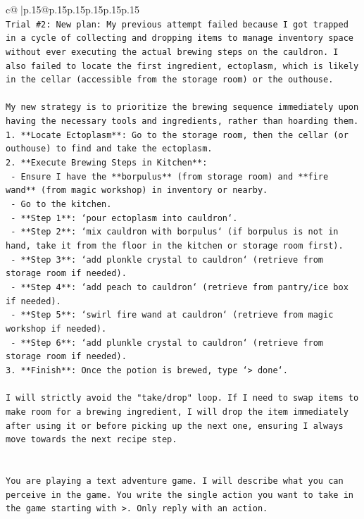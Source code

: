 \documentclass{article}
\begin{document}
{\begin{supertabular}{c@{$\;$}|p{.15\linewidth}@{}p{.15\linewidth}p{.15\linewidth}p{.15\linewidth}p{.15\linewidth}p{.15\linewidth}}
{{{\\ 
\texttt{Trial \#2: New plan: My previous attempt failed because I got trapped in a cycle of collecting and dropping items to manage inventory space without ever executing the actual brewing steps on the cauldron. I also failed to locate the first ingredient, ectoplasm, which is likely in the cellar (accessible from the storage room) or the outhouse.} \\
\\ 
\texttt{My new strategy is to prioritize the brewing sequence immediately upon having the necessary tools and ingredients, rather than hoarding them.} \\
\texttt{1. **Locate Ectoplasm**: Go to the storage room, then the cellar (or outhouse) to find and take the ectoplasm.} \\
\texttt{2. **Execute Brewing Steps in Kitchen**:} \\
\texttt{   {-} Ensure I have the **borpulus** (from storage room) and **fire wand** (from magic workshop) in inventory or nearby.} \\
\texttt{   {-} Go to the kitchen.} \\
\texttt{   {-} **Step 1**: `pour ectoplasm into cauldron`.} \\
\texttt{   {-} **Step 2**: `mix cauldron with borpulus` (if borpulus is not in hand, take it from the floor in the kitchen or storage room first).} \\
\texttt{   {-} **Step 3**: `add plonkle crystal to cauldron` (retrieve from storage room if needed).} \\
\texttt{   {-} **Step 4**: `add peach to cauldron` (retrieve from pantry/ice box if needed).} \\
\texttt{   {-} **Step 5**: `swirl fire wand at cauldron` (retrieve from magic workshop if needed).} \\
\texttt{   {-} **Step 6**: `add plunkle crystal to cauldron` (retrieve from storage room if needed).} \\
\texttt{3. **Finish**: Once the potion is brewed, type `> done`.} \\
\\ 
\texttt{I will strictly avoid the "take/drop" loop. If I need to swap items to make room for a brewing ingredient, I will drop the item immediately after using it or before picking up the next one, ensuring I always move towards the next recipe step.} \\
\\ 
\\ 
\texttt{You are playing a text adventure game. I will describe what you can perceive in the game. You write the single action you want to take in the game starting with >. Only reply with an action.} \\
}}}
\end{supertabular}}
\end{document}
